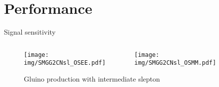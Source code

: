 \documentclass{beamer}
\begin{document}
\section{Performance}



\begin{frame}{Signal sensitivity}
  \begin{figure}\begin{columns}
    \begin{column}{0.5\textwidth}
      \texttt{[image: img/SMGG2CNsl\_OSEE.pdf]}
    \end{column}
    \begin{column}{0.5\textwidth}
      \texttt{[image: img/SMGG2CNsl\_OSMM.pdf]}
    \end{column}
  \end{columns}
    \caption{Gluino production with intermediate slepton}
  \end{figure}
\end{frame}
\end{document}
